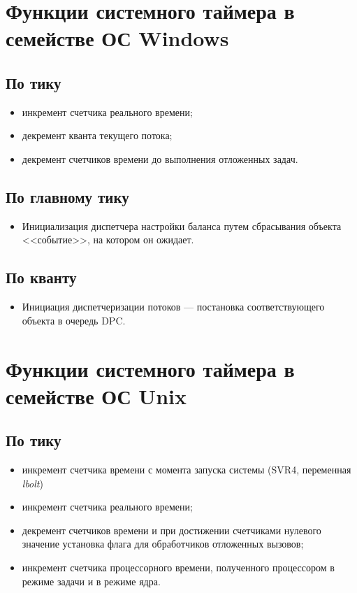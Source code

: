 \section*{Функции системного таймера в семействе ОС Windows}

\subsection*{По тику}
\begin{itemize}
	\item инкремент счетчика реального времени;
	\item декремент кванта текущего потока;
	\item декремент счетчиков времени до выполнения отложенных задач.
\end{itemize}

\subsection*{По главному тику}
\begin{itemize}
	\item Инициализация диспетчера настройки баланса путем сбрасывания объекта <<событие>>, на котором он ожидает.
\end{itemize}

\subsection*{По кванту}
\begin{itemize}
	\item Инициация диспетчеризации потоков --- постановка соответствующего объекта в очередь DPC.
\end{itemize}



\section*{Функции системного таймера в семействе ОС Unix} %

\subsection*{По тику}

\begin{itemize}
	\item инкремент счетчика времени с момента запуска системы (SVR4, переменная \textit{lbolt})
	\item инкремент счетчика реального времени; %
	\item декремент счетчиков времени и при достижении счетчиками нулевого значение установка флага для обработчиков отложенных вызовов;
	\item инкремент счетчика процессорного времени, полученного процессором в режиме задачи и в режиме ядра.
\end{itemize}

